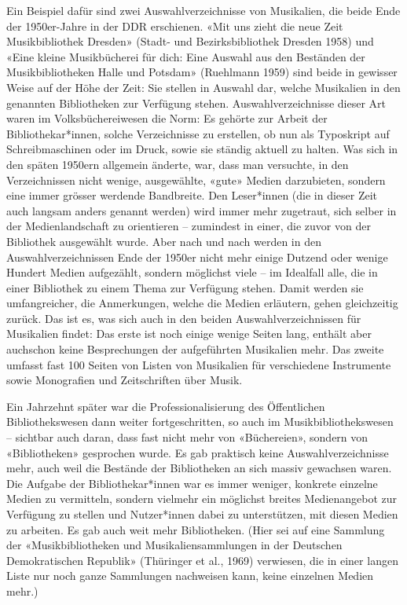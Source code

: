 \documentclass[a4paper,
fontsize=11pt,
oneside,
numbers=noperiodatend,
parskip=half-,
bibliography=totoc,
final
]{scrartcl}
\begin{document}
Ein Beispiel dafür sind zwei Auswahlverzeichnisse von Musikalien, die
beide Ende der 1950er-Jahre in der DDR erschienen. «Mit uns zieht die
neue Zeit Musikbibliothek Dresden» (Stadt- und Bezirksbibliothek Dresden
1958) und «Eine kleine Musikbücherei für dich: Eine Auswahl aus den
Beständen der Musikbibliotheken Halle und Potsdam» (Ruehlmann 1959) sind
beide in gewisser Weise auf der Höhe der Zeit: Sie stellen in Auswahl
dar, welche Musikalien in den genannten Bibliotheken zur Verfügung
stehen. Auswahlverzeichnisse dieser Art waren im Volksbüchereiwesen die
Norm: Es gehörte zur Arbeit der Bibliothekar*innen, solche Verzeichnisse
zu erstellen, ob nun als Typoskript auf Schreibmaschinen oder im Druck,
sowie sie ständig aktuell zu halten. Was sich in den späten 1950ern
allgemein änderte, war, dass man versuchte, in den Verzeichnissen nicht
wenige, ausgewählte, «gute» Medien darzubieten, sondern eine immer
grösser werdende Bandbreite. Den Leser*innen (die in dieser Zeit auch
langsam anders genannt werden) wird immer mehr zugetraut, sich selber in
der Medienlandschaft zu orientieren -- zumindest in einer, die zuvor von
der Bibliothek ausgewählt wurde. Aber nach und nach werden in den
Auswahlverzeichnissen Ende der 1950er nicht mehr einige Dutzend oder
wenige Hundert Medien aufgezählt, sondern möglichst viele -- im
Idealfall alle, die in einer Bibliothek zu einem Thema zur Verfügung
stehen. Damit werden sie umfangreicher, die Anmerkungen, welche die
Medien erläutern, gehen gleichzeitig zurück. Das ist es, was sich auch
in den beiden Auswahlverzeichnissen für Musikalien findet: Das erste ist
noch einige wenige Seiten lang, enthält aber auchschon keine
Besprechungen der aufgeführten Musikalien mehr. Das zweite umfasst fast
100 Seiten von Listen von Musikalien für verschiedene Instrumente sowie
Monografien und Zeitschriften über Musik.

Ein Jahrzehnt später war die Professionalisierung des Öffentlichen
Bibliothekswesen dann weiter fortgeschritten, so auch im
Musikbibliothekswesen -- sichtbar auch daran, dass fast nicht mehr von
«Büchereien», sondern von «Bibliotheken» gesprochen wurde. Es gab
praktisch keine Auswahlverzeichnisse mehr, auch weil die Bestände der
Bibliotheken an sich massiv gewachsen waren. Die Aufgabe der
Bibliothekar*innen war es immer weniger, konkrete einzelne Medien zu
vermitteln, sondern vielmehr ein möglichst breites Medienangebot zur
Verfügung zu stellen und Nutzer*innen dabei zu unterstützen, mit diesen
Medien zu arbeiten. Es gab auch weit mehr Bibliotheken. (Hier sei auf
eine Sammlung der «Musikbibliotheken und Musikaliensammlungen in der
Deutschen Demokratischen Republik» (Thüringer et al., 1969) verwiesen,
die in einer langen Liste nur noch ganze Sammlungen nachweisen kann,
keine einzelnen Medien mehr.)
\end{document}
